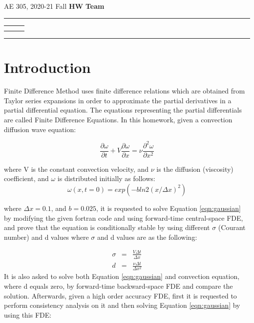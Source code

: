 \documentclass[letterpaper,12pt]{article}
\begin{document}
\begin{center}
AE 305, 2020-21 Fall \hfill \textbf{HW \HWno} \hfill \textbf{Team \TeamNo} \\
\noindent\rule{\textwidth}{0.4pt}
\begin{tabular}{p{} | p{} | p{} }
	\AuthorOneName&\AuthorTwoName&\AuthorThreeName\\
	\textit{\AuthorOneID}&\textit{\AuthorTwoID}&\textit{\AuthorThreeID}
\end{tabular}
\noindent\rule{\textwidth}{0.4pt}
\end{center}


\section{Introduction}
Finite Difference Method uses finite difference relations which are obtained from Taylor
series expansions in order to approximate the partial derivatives in a partial differential
equation. The equations representing the partial differentials are called Finite Difference
Equations. In this homework, given a convection diffusion wave equation:

\begin{equation}
	\frac{\partial \omega}{\partial t} + V\frac{\partial \omega}{\partial x} = \nu\frac{\partial^2 \omega}{\partial x^2}
	\label{eqn:gaussian}
\end{equation}

where V is the constant convection velocity, and $\nu$ is the diffusion (viscosity) coefficient,
and $\omega$ is distributed initially as follows:
\begin{equation}
	\omega(x,t=0) = exp(-b ln2(x/\Delta x)^2)
\end{equation}

where $\Delta x = 0.1$, and $b = 0.025$, it is requested to solve Equation \ref{eqn:gaussian} by modifying the given fortran code and
using forward-time central-space FDE, and prove that the equation is conditionally stable by
using different $\sigma$ (Courant number) and d values where $\sigma$ and d values are as the following:

\begin{eqnarray}
	\sigma &=& \frac{V\Delta t}{\Delta x} \nonumber \\
	d &=& \frac{\nu\Delta t}{\Delta x^2}
\end{eqnarray}
It is also asked to solve both Equation \ref{eqn:gaussian} and convection equation, where d equals
zero, by forward-time backward-space FDE and compare the solution. Afterwards, given a high order
accuracy FDE, first it is requested to perform consistency analysis on it and then solving
Equation \ref{eqn:gaussian} by using this FDE:
\end{document}
